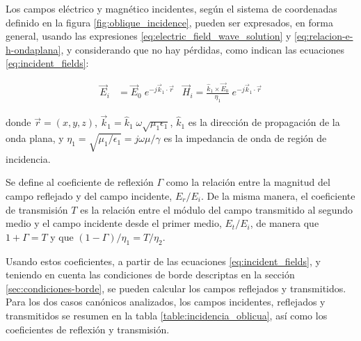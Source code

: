 Los campos eléctrico y magnético incidentes, según el sistema de coordenadas definido en la figura \ref{fig:oblique_incidence}, pueden ser expresados, en forma general, usando las expresiones \ref{eq:electric_field_wave_solution} y \ref{eq:relacion-e-h-ondaplana}, y considerando que no hay pérdidas, como indican las ecuaciones \ref{eq:incident_fields}:

\begin{align}
	\label{eq:incident_fields}
	\vec{E}_i &= \vec{E}_0 \;e^{-j\vec{k}_1 \cdot \vec{r}} &
	\vec{H}_i = \frac{\hat{k}_1 \times \vec{E}_0}{\eta_1} \;e^{-j\vec{k}_1 \cdot \vec{r}}
\end{align}

donde $\vec{r}=(x,y,z)$, $\vec{k}_1 = \hat{k}_1 \;\omega \sqrt{\mu_1 \epsilon_1}$, $\hat{k}_1$ es la dirección de propagación de la onda plana, y $\eta_1 = \sqrt{\mu_1 / \epsilon_1} = j\omega \mu / \gamma$ es la impedancia de onda de región de incidencia.

Se define al coeficiente de reflexión $\Gamma$ como la relación entre la magnitud del campo reflejado y del campo incidente, $E_r / E_i$. De la misma manera, el coeficiente de transmisión $T$ es la relación entre el módulo del campo transmitido al segundo medio y el campo incidente desde el primer medio, $E_t / E_i$, de manera que $1+\Gamma = T$ y que $(1-\Gamma)/\eta_1 = T/\eta_2$. 

Usando estos coeficientes, a partir de las ecuaciones \ref{eq:incident_fields}, y teniendo en cuenta las condiciones de borde descriptas en la sección \ref{sec:condiciones-borde}, se pueden calcular los campos reflejados y transmitidos. Para los dos casos canónicos analizados, los campos incidentes, reflejados y transmitidos se resumen en la tabla \ref{table:incidencia_oblicua}, así como los coeficientes de reflexión y transmisión.

